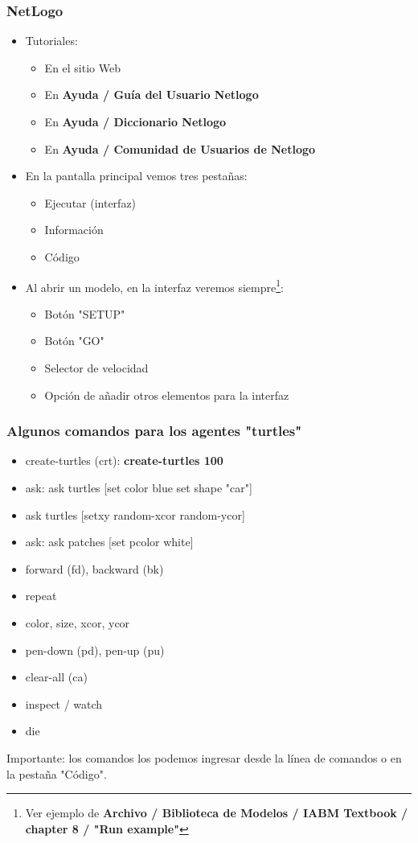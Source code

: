 \documentclass[11pt]{beamer}
\begin{document}
\begin{frame}
\frametitle{NetLogo}
\begin{itemize}
	\item Tutoriales:
	\begin{itemize}
		\item En el sitio Web
		\item En \textbf{Ayuda / Guía del Usuario Netlogo}
		\item En \textbf{Ayuda / Diccionario Netlogo}
		\item En \textbf{Ayuda / Comunidad de Usuarios de Netlogo}
	\end{itemize}
	\item En la pantalla principal vemos tres pestañas:
	\begin{itemize}
		\item Ejecutar (interfaz)
		\item Información
		\item Código
	\end{itemize}
\item Al abrir un modelo, en la interfaz veremos siempre\footnote{Ver ejemplo de \textbf{Archivo / Biblioteca de Modelos / IABM Textbook / chapter 8 / "Run example"}}:
\begin{itemize}
	\item Botón "SETUP"
	\item Botón "GO"
	\item Selector de velocidad
	\item Opción de añadir otros elementos para la interfaz
\end{itemize}
\end{itemize}
\end{frame}

\begin{frame}
\frametitle{Algunos comandos para los agentes "turtles"}
\begin{itemize}
\small	\item create-turtles (crt): \textbf{create-turtles 100} 
	\item ask: ask turtles [set color blue set shape "car"]
	\item ask turtles [setxy random-xcor random-ycor]
	\item ask: ask patches [set pcolor white]
	\item forward (fd), backward (bk)
	\item repeat
	\item color, size, xcor, ycor
	\item pen-down (pd), pen-up (pu)
	\item clear-all (ca)
	\item inspect / watch
	\item die
\end{itemize}
Importante: los comandos los podemos ingresar desde la línea de comandos o en la pestaña "Código".
\end{frame}
\end{document}
